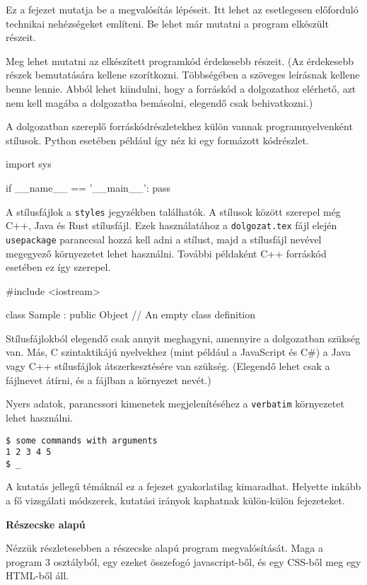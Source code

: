 
Ez a fejezet mutatja be a megvalósítás lépéseit.
Itt lehet az esetlegesen előforduló technikai nehézségeket említeni.
Be lehet már mutatni a program elkészült részeit.

Meg lehet mutatni az elkészített programkód érdekesebb részeit.
(Az érdekesebb részek bemutatására kellene szorítkozni.
Többségében a szöveges leírásnak kellene benne lennie.
Abból lehet kiindulni, hogy a forráskód a dolgozathoz elérhető, azt nem kell magába a dolgozatba bemásolni, elegendő csak behivatkozni.)

A dolgozatban szereplő forráskódrészletekhez külön vannak programnyelvenként stílusok.
Python esetében például így néz ki egy formázott kódrészlet.
\begin{python}
import sys

if __name__ == '__main__':
    pass
\end{python}

A stílusfájlok a \texttt{styles} jegyzékben találhatók.
A stílusok között szerepel még C++, Java és Rust stílusfájl.
Ezek használatához a \texttt{dolgozat.tex} fájl elején \texttt{usepackage} paranccsal hozzá kell adni a stílust, majd a stílusfájl nevével megegyező környezetet lehet használni.
További példaként C++ forráskód esetében ez így szerepel.
\begin{cpp}
#include <iostream>

class Sample : public Object
{
    // An empty class definition
}
\end{cpp}
Stílusfájlokból elegendő csak annyit meghagyni, amennyire a dolgozatban szükség van.
Más, C szintaktikájú nyelvekhez (mint például a JavaScript és C\#) a Java vagy C++ stílusfájlok átszerkesztésére van szükség.
(Elegendő lehet csak a fájlnevet átírni, és a fájlban a környezet nevét.)

Nyers adatok, parancssori kimenetek megjelenítéséhez a \texttt{verbatim} környezetet lehet használni.
\begin{verbatim}
$ some commands with arguments
1 2 3 4 5
$ _
\end{verbatim}

A kutatás jellegű témáknál ez a fejezet gyakorlatilag kimaradhat.
Helyette inkább a fő vizsgálati módszerek, kutatási irányok kaphatnak külön-külön fejezeteket.


\textbf{Részecske alapú}

Nézzük részletesebben a részecske alapú program megvalósítását. Maga a program 3 osztályból, egy ezeket összefogó javascript-ből, és egy CSS-ből meg egy HTML-ből áll. 

